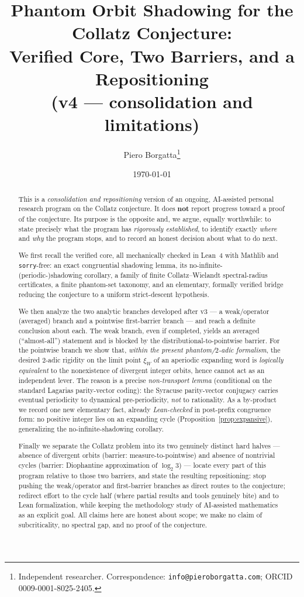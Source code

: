 \documentclass[11pt,a4paper]{article}
\title{
  Phantom Orbit Shadowing for the Collatz Conjecture: \\
  Verified Core, Two Barriers, and a Repositioning \\
  \large (v4 --- consolidation and limitations)
}
\author{Piero Borgatta\thanks{Independent researcher. Correspondence:
\texttt{info@pieroborgatta.com}; ORCID 0009-0001-8025-2405.}}
\date{\today}
\theoremstyle{definition}
\begin{document}
\maketitle

\begin{abstract}
This is a \emph{consolidation and repositioning} version of an ongoing,
AI-assisted personal research program on the Collatz conjecture. It does
\textbf{not} report progress toward a proof of the conjecture. Its purpose
is the opposite and, we argue, equally worthwhile: to state precisely what
the program has \emph{rigorously established}, to identify exactly
\emph{where} and \emph{why} the program stops, and to record an honest
decision about what to do next.

We first recall the verified core, all mechanically checked in Lean~4 with
Mathlib and \texttt{sorry}-free: an exact congruential shadowing lemma, its
no-infinite-(periodic-)shadowing corollary, a family of finite
Collatz--Wielandt spectral-radius certificates, a finite phantom-set
taxonomy, and an elementary, formally verified bridge reducing the
conjecture to a uniform strict-descent hypothesis.

We then analyze the two analytic branches developed after v3 --- a
weak/operator (averaged) branch and a pointwise first-barrier branch ---
and reach a definite conclusion about each. The weak branch, even if
completed, yields an averaged (``almost-all'') statement and is blocked by
the distributional-to-pointwise barrier. For the pointwise branch we show that, \emph{within the present
phantom/$2$-adic formalism}, the desired
2-adic rigidity on the limit point $\xi_W$ of an aperiodic expanding word
is \emph{logically equivalent} to the nonexistence of divergent integer
orbits, hence cannot act as an independent lever. The reason is a precise
\emph{non-transport lemma} (conditional on the standard Lagarias
parity-vector coding): the Syracuse parity-vector conjugacy carries
eventual periodicity to dynamical pre-periodicity, \emph{not} to
rationality. As a by-product we record one new elementary fact, already
\emph{Lean-checked} in post-prefix congruence form: no positive integer
lies on an expanding cycle (Proposition~\ref{prop:expansive}), generalizing
the no-infinite-shadowing corollary.

Finally we separate the Collatz problem into its two genuinely distinct
hard halves --- absence of divergent orbits (barrier: measure-to-pointwise)
and absence of nontrivial cycles (barrier: Diophantine approximation of
$\log_2 3$) --- locate every part of this program relative to those two
barriers, and state the resulting repositioning: stop pushing the
weak/operator and first-barrier branches as direct routes to the
conjecture; redirect effort to the cycle half (where partial results and
tools genuinely bite) and to Lean formalization, while keeping the
methodology study of AI-assisted mathematics as an explicit goal. All
claims here are honest about scope; we make no claim of subcriticality, no
spectral gap, and no proof of the conjecture.
\end{abstract}
\end{document}
